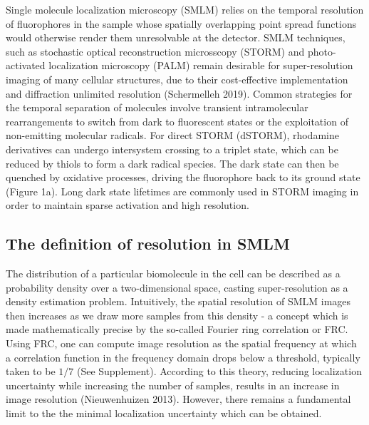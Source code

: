 \documentclass{ucetd}
\begin{document}
Single molecule localization microscopy (SMLM) relies on the temporal resolution of fluorophores in the sample whose spatially overlapping point spread functions would otherwise render them unresolvable at the detector. SMLM techniques, such as stochastic optical reconstruction microsscopy (STORM) and photo-activated localization microscopy (PALM) remain desirable for super-resolution imaging of many cellular structures, due to their cost-effective implementation and diffraction unlimited resolution (Schermelleh 2019). Common strategies for the temporal separation of molecules involve transient intramolecular rearrangements to switch from dark to fluorescent states or the exploitation of non-emitting molecular radicals. For direct STORM (dSTORM), rhodamine derivatives can undergo intersystem crossing to a triplet state, which can be reduced by thiols to form a dark radical species. The dark state can then be quenched by oxidative processes, driving the fluorophore back to its ground state (Figure 1a). Long dark state lifetimes are commonly used in STORM imaging in order to maintain sparse activation and high resolution.

\subsection{The definition of resolution in SMLM}

The distribution of a particular biomolecule in the cell can be described as a probability density over a two-dimensional space, casting super-resolution as a density estimation problem. Intuitively, the spatial resolution of SMLM images then increases as we draw more samples from this density - a concept which is made mathematically precise by the so-called Fourier ring correlation or FRC. Using FRC, one can compute image resolution as the spatial frequency at which a correlation function in the frequency domain drops below a threshold, typically taken to be $1/7$ (See Supplement). According to this theory, reducing localization uncertainty while increasing the number of samples, results in an increase in image resolution (Nieuwenhuizen 2013). However, there remains a fundamental limit to the the minimal localization uncertainty which can be obtained.
\end{document}
